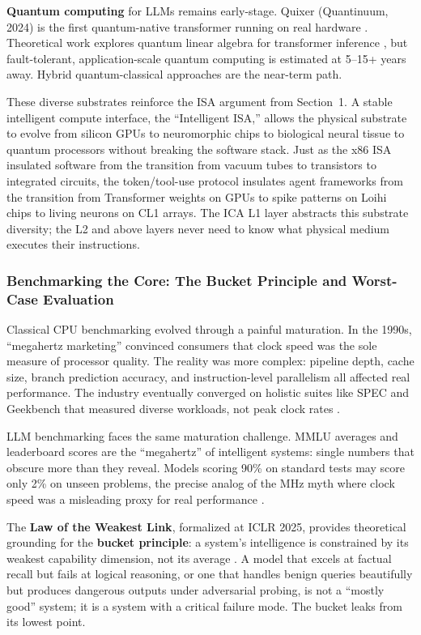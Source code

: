 \textbf{Quantum computing} for LLMs remains early-stage. Quixer (Quantinuum, 2024) is the first quantum-native transformer running on real hardware \cite{khatri_2024_quixer}. Theoretical work explores quantum linear algebra for transformer inference \cite{guo_2024_quantum_transformer}, but fault-tolerant, application-scale quantum computing is estimated at 5--15+ years away. Hybrid quantum-classical approaches are the near-term path.

These diverse substrates reinforce the ISA argument from Section~1. A stable intelligent compute interface, the ``Intelligent ISA,'' allows the physical substrate to evolve from silicon GPUs to neuromorphic chips to biological neural tissue to quantum processors without breaking the software stack. Just as the x86 ISA insulated software from the transition from vacuum tubes to transistors to integrated circuits, the token/tool-use protocol insulates agent frameworks from the transition from Transformer weights on GPUs to spike patterns on Loihi chips to living neurons on CL1 arrays. The ICA L1 layer abstracts this substrate diversity; the L2 and above layers never need to know what physical medium executes their instructions.

\subsubsection{Benchmarking the Core: The Bucket Principle and Worst-Case Evaluation}

Classical CPU benchmarking evolved through a painful maturation. In the 1990s, ``megahertz marketing'' convinced consumers that clock speed was the sole measure of processor quality. The reality was more complex: pipeline depth, cache size, branch prediction accuracy, and instruction-level parallelism all affected real performance. The industry eventually converged on holistic suites like SPEC and Geekbench that measured diverse workloads, not peak clock rates \cite{spec_benchmark}.

LLM benchmarking faces the same maturation challenge. MMLU averages and leaderboard scores are the ``megahertz'' of intelligent systems: single numbers that obscure more than they reveal. Models scoring 90\% on standard tests may score only 2\% on unseen problems, the precise analog of the MHz myth where clock speed was a misleading proxy for real performance \cite{fodor_2025_benchmarks}.

The \textbf{Law of the Weakest Link}, formalized at ICLR 2025, provides theoretical grounding for the \textbf{bucket principle}: a system's intelligence is constrained by its weakest capability dimension, not its average \cite{zhong_2024_weakest_link}. A model that excels at factual recall but fails at logical reasoning, or one that handles benign queries beautifully but produces dangerous outputs under adversarial probing, is not a ``mostly good'' system; it is a system with a critical failure mode. The bucket leaks from its lowest point.

